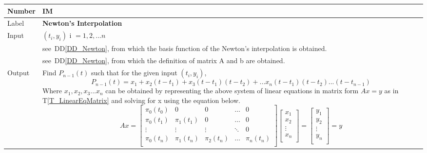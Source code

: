 \documentclass[12pt]{article}
\newcommand{\colAwidth}{0.13\textwidth}
\newcommand{\colBwidth}{0.82\textwidth}
\newcommand{\ddref}[1]{DD\ref{#1}}
\newcommand{\tref}[1]{T\ref{#1}}
\newcounter{instnum} %
\begin{document}
\noindent
\begin{minipage}{\textwidth}
	\renewcommand*{\arraystretch}{1.5}
	\begin{tabular}{| p{\colAwidth} | p{\colBwidth}|}
		\hline
		\rowcolor[gray]{0.9}
		Number& IM{instnum}\theinstnum \label{IM_Newton}\\
		\hline
		Label& \bf Newton's Interpolation\\
		\hline
		
		Input
		& $(t_i,y_i)$ i $= {1,2,...n}$\\
		& see~\ddref{DD_Newton}, from which the basis function of the Newton's interpolation is obtained.\\
		& see~\ddref{DD_Newton}, from which the definition of matrix A and b are obtained.\\
		\hline
		
		Output
		&Find $P_{n-1}(t)$ such that for the given input $(t_i,y_i)$,
		\begin{equation*}
		P_{n-1} (t) = x_1 + x_2(t-t_1) + x_3(t-t_1)(t-t_2) + ... x_n(t-t_1)(t-t_2)...(t-t_{n-1})
		\end{equation*}
		Where $x_1, x_2, x_3 ... x_n$ can be obtained by representing the above system of linear equations in matrix form $Ax = y$ as in \tref{T_LinearEqMatrix} and solving for x using the equation below.
		\begin{equation*}
		Ax = \begin{bmatrix}
		\pi_0 (t_0) & 0           & 0            & \dots         & 0 \\
		\pi_0 (t_1) & \pi_1 (t_1) & 0            & \dots         & 0 \\
		\vdots      & \vdots      & \vdots       &\ddots         & 0 \\
		\pi_0 (t_n) & \pi_1 (t_n) & \pi_2 (t_n)  & \dots         & \pi_n (t_n) \\
		\end{bmatrix}
		\begin{bmatrix}
		x_1  \\
		x_2 \\
		\vdots \\
		x_n \\
		\end{bmatrix} = 
		\begin{bmatrix}
		y_1  \\
		y_2 \\
		\vdots \\
		y_n \\
		\end{bmatrix} = y
		\end{equation*}\\ 
		\hline
		

\end{tabular}
\end{minipage}
\end{document}
